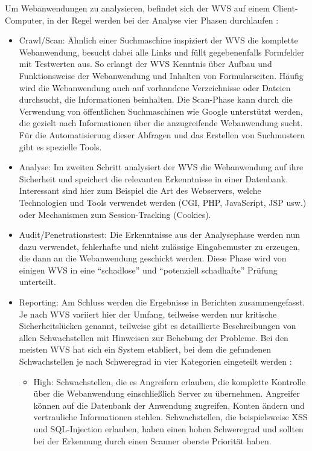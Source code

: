 \documentclass[12pt,oneside,a4paper,parskip,pointlessnumbers]{scrbook}
\begin{document}
  Um Webanwendungen zu analysieren, befindet sich der WVS  auf einem Client-Computer, in der Regel werden bei der Analyse vier Phasen durchlaufen \cite{BSI4}:
  \begin{itemize}
    \item Crawl/Scan:
    Ähnlich einer Suchmaschine inspiziert der WVS die komplette Webanwendung, besucht dabei alle Links und füllt gegebenenfalls Formfelder mit Testwerten aus. So erlangt der WVS Kenntnis über Aufbau und Funktionsweise der Webanwendung und Inhalten von Formularseiten.
    Häufig wird die Webanwendung auch auf vorhandene Verzeichnisse oder Dateien durchsucht, die Informationen beinhalten. Die Scan-Phase kann durch die Verwendung von öffentlichen Suchmaschinen wie Google unterstützt werden, die gezielt nach Informationen über die anzugreifende Webanwendung sucht.
    Für die Automatisierung dieser Abfragen und das Erstellen von Suchmustern gibt es spezielle Tools.
    \item Analyse:
    Im zweiten Schritt analysiert der WVS die Webanwendung auf ihre Sicherheit und speichert die relevanten Erkenntnisse in einer Datenbank. Interessant sind hier zum Beispiel die Art des Webservers, welche Technologien und Tools verwendet werden (CGI, PHP, JavaScript, JSP usw.) oder Mechanismen zum Session-Tracking (Cookies).
    \item Audit/Penetrationstest:
    Die Erkenntnisse aus der Analysephase werden nun dazu verwendet, fehlerhafte und nicht zulässige Eingabemuster zu erzeugen, die dann an die Webanwendung geschickt werden. Diese Phase wird von einigen WVS in eine ``schadlose'' und ``potenziell schadhafte'' Prüfung unterteilt.
    \item Reporting:
    Am Schluss werden die Ergebnisse in Berichten zusammengefasst.
    Je nach WVS variiert hier der Umfang, teilweise werden nur kritische Sicherheitslücken genannt, teilweise gibt es detaillierte Beschreibungen von allen Schwachstellen mit Hinweisen zur Behebung der Probleme.
    Bei den meisten WVS hat sich ein System etabliert, bei dem die gefundenen Schwachstellen je nach Schweregrad in vier Kategorien eingeteilt werden \cite{Lepofsky}:
    \begin{itemize}
      \item High: Schwachstellen, die es Angreifern erlauben, die komplette Kontrolle über die Webanwendung einschließlich Server zu übernehmen. Angreifer können auf die Datenbank der Anwendung zugreifen, Konten ändern und vertrauliche Informationen stehlen. Schwachstellen, die beispielsweise XSS und SQL-Injection erlauben, haben einen hohen Schweregrad und sollten bei der Erkennung durch einen Scanner oberste Priorität haben.


\end{itemize}
\end{itemize}
\end{document}
